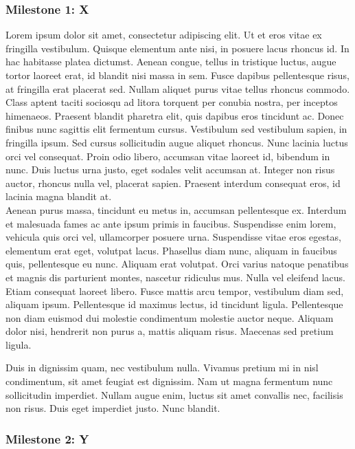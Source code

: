 \subsubsection{Milestone 1: X} %

Lorem ipsum dolor sit amet, consectetur adipiscing elit. Ut et eros vitae ex fringilla vestibulum. Quisque elementum ante nisi, in posuere lacus rhoncus id. In hac habitasse platea dictumst. Aenean congue, tellus in tristique luctus, augue tortor laoreet erat, id blandit nisi massa in sem. Fusce dapibus pellentesque risus, at fringilla erat placerat sed. Nullam aliquet purus vitae tellus rhoncus commodo. Class aptent taciti sociosqu ad litora torquent per conubia nostra, per inceptos himenaeos. Praesent blandit pharetra elit, quis dapibus eros tincidunt ac. Donec finibus nunc sagittis elit fermentum cursus. Vestibulum sed vestibulum sapien, in fringilla ipsum. Sed cursus sollicitudin augue aliquet rhoncus. Nunc lacinia luctus orci vel consequat. Proin odio libero, accumsan vitae laoreet id, bibendum in nunc. Duis luctus urna justo, eget sodales velit accumsan at. Integer non risus auctor, rhoncus nulla vel, placerat sapien. Praesent interdum consequat eros, id lacinia magna blandit at. \\

Aenean purus massa, tincidunt eu metus in, accumsan pellentesque ex. Interdum et malesuada fames ac ante ipsum primis in faucibus. Suspendisse enim lorem, vehicula quis orci vel, ullamcorper posuere urna. Suspendisse vitae eros egestas, elementum erat eget, volutpat lacus. Phasellus diam nunc, aliquam in faucibus quis, pellentesque eu nunc. Aliquam erat volutpat. Orci varius natoque penatibus et magnis dis parturient montes, nascetur ridiculus mus. Nulla vel eleifend lacus. Etiam consequat laoreet libero. Fusce mattis arcu tempor, vestibulum diam sed, aliquam ipsum. Pellentesque id maximus lectus, id tincidunt ligula. Pellentesque non diam euismod dui molestie condimentum molestie auctor neque. Aliquam dolor nisi, hendrerit non purus a, mattis aliquam risus. Maecenas sed pretium ligula.

Duis in dignissim quam, nec vestibulum nulla. Vivamus pretium mi in nisl condimentum, sit amet feugiat est dignissim. Nam ut magna fermentum nunc sollicitudin imperdiet. Nullam augue enim, luctus sit amet convallis nec, facilisis non risus. Duis eget imperdiet justo. Nunc blandit.

\subsubsection{Milestone 2: Y} %

